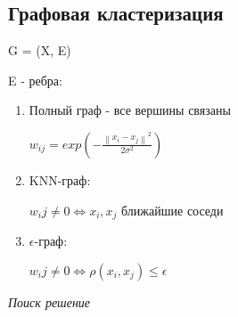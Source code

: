 \documentclass[a4paper, 12pt]{article}
\newcommand\norm[1]{\left\lVert#1\right\rVert}
\begin{document}
\subsection{Графовая кластеризация}

G = (X, E)

E - ребра:

\begin{enumerate}
    \item Полный граф - все вершины связаны
     
    $w_{ij} = exp(-\frac{\norm{x_i - x_j}^2}{2 \sigma^{2}})$
    \item KNN-граф:
    
    $w_ij \neq 0 \Leftrightarrow x_i, x_j$ ближайшие соседи
    
    \item $\epsilon$-граф:
    
    $w_ij \neq 0 \Leftrightarrow \rho(x_i, x_j) \leq \epsilon$ 
\end{enumerate}

\textit{Поиск решение}
\end{document}
